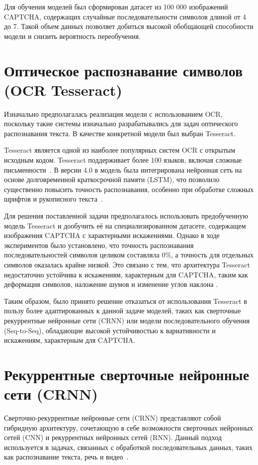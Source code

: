 \documentclass{altsu-report}
\begin{document}
Для обучения моделей был сформирован датасет из 100 000 изображений CAPTCHA, содержащих случайные последовательности символов длиной от 4 до 7. Такой объем данных позволяет добиться высокой обобщающей способности модели и снизить вероятность переобучения.

\chapter{Оптическое распознавание символов (OCR Tesseract)}

Изначально предполагалась реализация модели с использованием OCR, поскольку такие системы изначально разрабатывались для задач оптического распознавания текста. В качестве конкретной модели был выбран Tesseract.

Tesseract является одной из наиболее популярных систем OCR с открытым исходным кодом. Tesseract поддерживает более 100 языков, включая сложные письменности~\cite{Klippa}. В версии 4.0 в модель была интегрирована нейронная сеть на основе долговременной краткосрочной памяти (LSTM), что позволило существенно повысить точность распознавания, особенно при обработке сложных шрифтов и рукописного текста~\cite{GitTesseract}.

Для решения поставленной задачи предполагалось использовать предобученную модель Tesseract и дообучить её на специализированном датасете, содержащем изображения CAPTCHA с характерными искажениями. Однако в ходе экспериментов было установлено, что точность распознавания последовательностей символов целиком составляла 0\%, а точность для отдельных символов оказалась крайне низкой. Это связано с тем, что архитектура Tesseract недостаточно устойчива к искажениям, характерным для CAPTCHA, таким как деформация символов, наложение шумов и изменение углов наклона \cite{TrainTesseract}.

Таким образом, было принято решение отказаться от использования Tesseract в пользу более адаптированных к данной задаче моделей, таких как сверточные рекуррентные нейронные сети (CRNN) или модели последовательного обучения (Seq-to-Seq), обладающие высокой устойчивостью к вариативности и искажениям, характерным для CAPTCHA.

\chapter{Рекуррентные сверточные нейронные сети (CRNN)}

Сверточно-рекуррентные нейронные сети (CRNN) представляют собой гибридную архитектуру, сочетающую в себе возможности сверточных нейронных сетей (CNN) и рекуррентных нейронных сетей (RNN). Данный подход используется в задачах, связанных с обработкой последовательных данных, таких как распознавание текста, речь и видео~\cite{CRNNHabr}.
\end{document}
